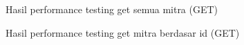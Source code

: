 \begin{figure}[H]
	{\par}
	\caption{Hasil performance testing get semua mitra (GET)}
	\label{mitra-testing}
\end{figure}

\begin{figure}[H]
	{\par}
	\caption{Hasil performance testing get mitra berdasar id (GET)}
	\label{mitra-id-testing}
\end{figure}

